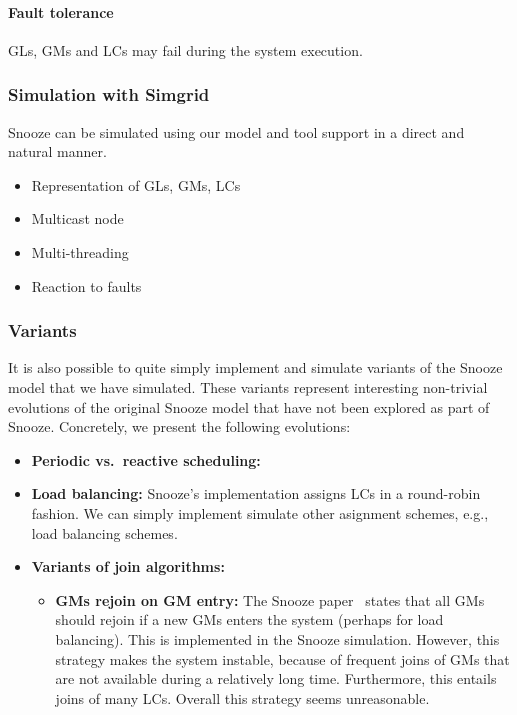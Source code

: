 \paragraph{Fault tolerance} 

GLs, GMs and LCs may fail during the system execution. 



\subsubsection{Simulation with Simgrid}

Snooze can be simulated using our model and tool support in a direct
and natural manner.

\begin{itemize}
  \item Representation of GLs, GMs, LCs
  \item Multicast node
  \item Multi-threading
  \item Reaction to faults
\end{itemize}

\subsubsection{Variants}

It is also possible to quite simply implement and simulate variants of
the Snooze model that we have simulated. These variants represent
interesting non-trivial evolutions of the original Snooze model that
have not been explored as part of Snooze. Concretely, we present the
following evolutions:

\begin{itemize}
  \item \textbf{Periodic vs.\ reactive scheduling:} 
  \item \textbf{Load balancing:} Snooze's implementation assigns LCs
    in a round-robin fashion. We can simply implement simulate other
    asignment schemes, e.g., load balancing schemes.
  \item \textbf{Variants of join algorithms:}
    \begin{itemize}
      \item \textbf{GMs rejoin on GM entry:} The Snooze
        paper~\cite{feller:ccgrid12} states that all GMs should rejoin if a new
        GMs enters the system (perhaps for load balancing). This is
        implemented in the Snooze simulation. However, this strategy
        makes the system instable, because of frequent joins of GMs
        that are not available during a relatively long
        time. Furthermore, this entails joins of many LCs. Overall
        this strategy seems unreasonable.
    \end{itemize}
\end{itemize}



